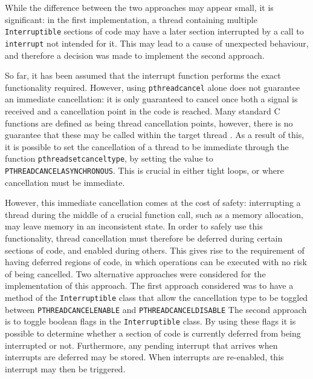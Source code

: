 While the difference between the two approaches may appear small, it is significant: 
in the first implementation, a thread containing multiple \texttt{Interruptible} 
sections of code may have a later section interrupted by a call to \texttt{interrupt}
not intended for it. This may lead to a cause of unexpected behaviour, and therefore 
a decision was made to implement the second approach. 
\par\bigskip\noindent
So far, it has been assumed that the interrupt function performs the exact 
functionality required. 
However, using \texttt{pthread\textunderscore{}cancel} alone does not guarantee 
an immediate cancellation: it is only guaranteed 
to cancel once both a signal is received and a cancellation point in the code 
is reached. 
Many standard C functions are defined as being thread cancellation points, however, 
there is no guarantee that these may be called within the target thread 
\cite{pthread-cancel-points}. As a result of this, it is possible to set the 
cancellation of a thread to be immediate through the function 
\texttt{pthread\textunderscore{}setcanceltype}, by setting the value to 
\texttt{PTHREAD\textunderscore{}CANCEL\textunderscore{}ASYNCHRONOUS}. This is 
crucial in either tight loops, or where cancellation must be immediate. 
\par\bigskip\noindent
However, this immediate cancellation comes at the cost of safety: interrupting a 
thread during the middle of a crucial function call, such as a memory allocation, 
may leave memory in an inconsistent state. In order to safely use this functionality, 
thread cancellation must therefore be deferred during certain sections of code, 
and enabled during others. This gives rise to the requirement of having 
deferred regions of code, in which operations can be executed with no risk of 
being cancelled. Two alternative approaches were considered for the implementation 
of this approach. The first approach considered was to have a method of the 
\texttt{Interruptible} class that allow the cancellation type to be toggled 
between \texttt{PTHREAD\textunderscore{}CANCEL\textunderscore{}ENABLE}
and \texttt{PTHREAD\textunderscore{}CANCEL\textunderscore{}DISABLE}
The second approach is to toggle boolean flags in the \texttt{Interruptible} class. 
By using these flags it is possible to determine whether a section of code is 
currently deferred from being interrupted or not. 
Furthermore, any pending interrupt that arrives when interrupts are deferred may 
be stored. When interrupts are re-enabled, this interrupt may then be triggered. 
